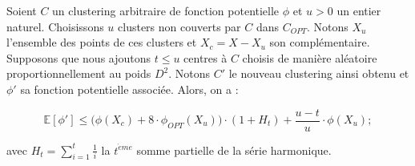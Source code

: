 \documentclass[12pt,a4paper]{book}
\newcommand{\E}{\mathbb{E}}
\newcommand{\1}{\mathds{1}}
\begin{document}
	\begin{env_lemme}\label{lemme3.3}
		Soient $C$ un clustering arbitraire de fonction potentielle $\phi$ et $u > 0$ un entier naturel.
		Choisissons $u$ clusters  non couverts par $C$ dans $C_{OPT}$. Notons $X_u$ l'ensemble des points de ces clusters et $X_c=X-X_u$ son complémentaire. Supposons que nous ajoutons $t \leq u$ centres à $C$ choisis de manière aléatoire proportionnellement au poids $D^2$. Notons $C'$ le nouveau clustering ainsi obtenu et $\phi'$ sa fonction potentielle associée. Alors, on a :
		
		$$
			\E\left[\phi'\right] \leq \bigg( \phi \left( X_c \right) + 8 \cdot \phi_{OPT} \left( X_u \right) \bigg) \cdot \left( 1 + H_t \right) + \frac{u-t}{u} \cdot \phi \left( X_u \right) ;
		$$
		
		avec $H_t = \displaystyle \sum_{i=1}^{t} \frac{1}{i}$ la $t^{\grave{e}me}$ somme partielle de la série harmonique.
	\end{env_lemme}	
	
\end{document}
